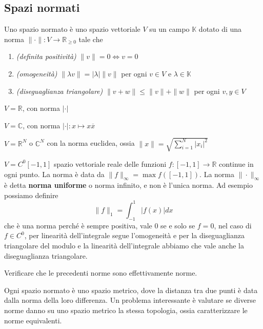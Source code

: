 \subsection{Spazi normati}
\begin{definition}
    Uno spazio normato è uno spazio vettoriale \(V\) su un campo \(\mathbb{K}\)
    dotato di una norma \(\| \cdot \| : V \to \mathbb{R}_{\ge 0} \) tale che
    \begin{enumerate}[label = \arabic*.]
        \item \emph{(definita positività)} \(\| v \| = 0 \iff v = 0\)
        \item \emph{(omogeneità)} \(\| \lambda v \| = |\lambda| \| v \|\) per ogni \(v \in V\) e
            \(\lambda \in \mathbb{K}\)
        \item \emph{(diseguaglianza triangolare)} \(\| v + w \| \le \| v \| + \| w \|\) per ogni \(v, y \in V\)
    \end{enumerate}
\end{definition}
\begin{example}
    \(V = \mathbb{R}\), con norma \(|\cdot |\)
\end{example}
\begin{example}
    \(V=\mathbb{C}\), con norma \(| \cdot | : x \mapsto x \overline{x}\)
\end{example}
\begin{example}
    \(V = \mathbb{R}^{N}\) o \(\mathbb{C}^{N}\) con la norma euclidea, ossia
\(\|x\| = \sqrt{\sum_{i=1}^{N} |x_i|^2}\)
\end{example}
\begin{example}
    \(V = C^{0}[-1, 1]\) spazio vettoriale reale delle funzioni \(f : [-1, 1]
    \to \mathbb{R} \) continue in ogni punto. La norma è data da
    \(\|f\|_{\infty} = \max f([-1, 1]) \).
    La norma \(\| \cdot \|_{\infty}\) è detta \textbf{norma uniforme} o norma
    infinito, e non è l'unica norma. Ad esempio possiamo definire
    \[
        \|f\|_{1} = \int_{-1}^{1} |f(x)| dx
    \]
    che è una norma perché è sempre positiva, vale 0 se e solo se \(f = 0\), nel
    caso di \(f \in C^{0}\), per linearità dell'integrale segue l'omogeneità e
    per la diseguaglianza triangolare del modulo e la linearità dell'integrale
    abbiamo che vale anche la diseguaglianza triangolare.
\end{example}
\begin{eser}
    Verificare che le precedenti norme sono effettivamente norme.
\end{eser}
Ogni spazio normato è uno spazio metrico, dove la distanza tra due punti è data
dalla norma della loro differenza. Un problema interessante è valutare se
diverse norme danno su uno spazio metrico la stessa topologia, ossia
caratterizzare le norme equivalenti.

